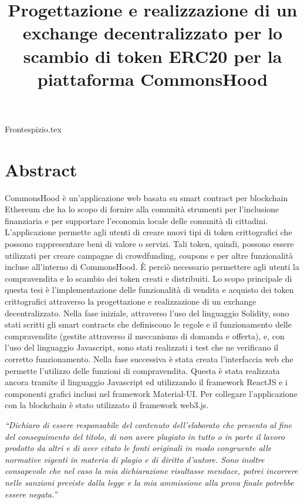 \documentclass[a4paper]{article}
\title{Progettazione e realizzazione di un exchange decentralizzato per lo scambio di token ERC20 per la piattaforma CommonsHood}
\begin{document}
    {Frontespizio.tex}
    \restoregeometry

    \section*{Abstract}
      CommonsHood è un’applicazione web basata su smart contract per blockchain Ethereum che ha lo scopo di fornire alla comunità strumenti per l’inclusione finanziaria e per supportare l’economia locale delle comunità di cittadini.
      L’applicazione permette agli utenti di creare nuovi tipi di token crittografici che possono rappresentare  beni di valore o servizi. Tali token, quindi, possono essere utilizzati per creare campagne di crowdfunding, coupons e per altre funzionalità incluse all’interno di CommonsHood. È perciò necessario permettere agli utenti la compravendita e lo scambio dei token creati e distribuiti.
      Lo scopo principale di questa tesi è l’implementazione delle funzionalità di vendita e acquisto dei token crittografici attraverso la progettazione e realizzazione di un exchange decentralizzato.
      Nella fase iniziale, attraverso l’uso del linguaggio Solidity, sono stati scritti gli smart contracts che definiscono le regole e il funzionamento delle compravendite (gestite attraverso il meccanismo di domanda e offerta), e, con l’uso del linguaggio Javascript, sono stati realizzati i test che ne verificano il corretto funzionamento.
      Nella fase successiva è stata creata l’interfaccia web che permette l’utilizzo delle funzioni di compravendita. Questa è stata realizzata ancora tramite il linguaggio Javascript ed utilizzando il framework ReactJS e i componenti grafici inclusi nel framework Material-UI. Per collegare l’applicazione con la blockchain è stato utilizzato il framework web3.js.

    \newpage
    \tableofcontents
    \newpage
    \begin{midpage}
      \textit{``Dichiaro  di  essere  responsabile  del  contenuto  dell'elaborato  che  presento  al 
      fine  del  conseguimento  del  titolo,  di  non  avere  plagiato  in  tutto  o  in  parte  il 
      lavoro prodotto da altri e di aver citato le fonti originali in modo congruente alle 
      normative  vigenti  in  materia  di  plagio  e  di  diritto  d'autore.  Sono  inoltre 
      consapevole  che  nel  caso  la  mia  dichiarazione  risultasse  mendace,  potrei 
      incorrere  nelle  sanzioni  previste  dalla  legge  e  la  mia  ammissione  alla  prova 
      finale potrebbe essere negata.''}
    \end{midpage}
\end{document}
